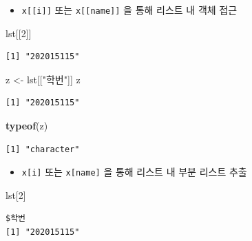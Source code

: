 \documentclass[
  11pt,
]{krantz}
\newenvironment{Shaded}{\begin{snugshade}}{\end{snugshade}}
\newcommand{\DecValTok}[1]{\textcolor[rgb]{0.06,0.06,0.06}{#1}}
\newcommand{\KeywordTok}[1]{\textcolor[rgb]{0.27,0.27,0.27}{\textbf{#1}}}
\newcommand{\NormalTok}[1]{#1}
\newcommand{\StringTok}[1]{\textcolor[rgb]{0.5,0.5,0.5}{#1}}
\providecommand{\tightlist}{%
  \setlength{\itemsep}{0pt}\setlength{\parskip}{0pt}}
\begin{document}
\begin{itemize}
\tightlist
\item
  \texttt{x{[}{[}i{]}{]}} 또는 \texttt{x{[}{[}name{]}{]}} 을 통해 리스트 내 객체 접근
\end{itemize}

\footnotesize

\begin{Shaded}
\begin{Highlighting}[]
\NormalTok{lst[[}\DecValTok{2}\NormalTok{]]}
\end{Highlighting}
\end{Shaded}

\begin{verbatim}
[1] "202015115"
\end{verbatim}

\begin{Shaded}
\begin{Highlighting}[]
\NormalTok{z <-}\StringTok{ }\NormalTok{lst[[}\StringTok{"학번"}\NormalTok{]]}
\NormalTok{z}
\end{Highlighting}
\end{Shaded}

\begin{verbatim}
[1] "202015115"
\end{verbatim}

\begin{Shaded}
\begin{Highlighting}[]
\KeywordTok{typeof}\NormalTok{(z)}
\end{Highlighting}
\end{Shaded}

\begin{verbatim}
[1] "character"
\end{verbatim}

\normalsize

\begin{itemize}
\tightlist
\item
  \texttt{x{[}i{]}} 또는 \texttt{x{[}name{]}} 을 통해 리스트 내 부분 리스트 추출
\end{itemize}

\footnotesize

\begin{Shaded}
\begin{Highlighting}[]
\NormalTok{lst[}\DecValTok{2}\NormalTok{]}
\end{Highlighting}
\end{Shaded}

\begin{verbatim}
$학번
[1] "202015115"
\end{verbatim}
\end{document}
